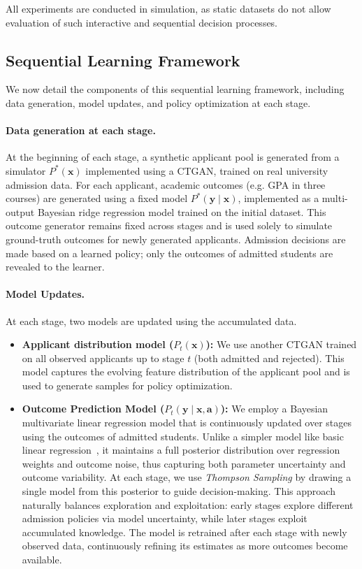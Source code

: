 \documentclass[acmlarge]{acmart-ecaf}
\newcommand {\Pfeat} {\mathbf{x}}
\newcommand {\Pact} {\mathbf{a}}
\newcommand {\Pout} {\mathbf{y}}
\begin{document}
All experiments are conducted in simulation, as static datasets do not allow evaluation of such interactive and sequential decision processes.

\subsection{Sequential Learning Framework}

We now detail the components of this sequential learning framework, including data generation, model updates, and policy optimization at each stage.


\paragraph{Data generation at each stage.} At the beginning of each stage, a synthetic applicant pool is generated from a simulator $P^*(\Pfeat)$ implemented using a CTGAN, trained on real university admission data. For each applicant, academic outcomes (e.g. GPA in three courses) are generated using a fixed model $P^*(\Pout \mid \Pfeat)$, implemented as a multi-output Bayesian ridge regression model trained on the initial dataset. This outcome generator remains fixed across stages and is used solely to simulate ground-truth outcomes for newly generated applicants. Admission decisions are made based on a learned policy; only the outcomes of admitted students are revealed to the learner.



\paragraph{Model Updates.} At each stage, two models are updated using the accumulated data.
\begin{itemize}

    \item \textbf{Applicant distribution model ($P_t(\Pfeat)$):} 
    We use another CTGAN trained on all observed applicants up to stage $t$ (both admitted and rejected). This model captures the evolving feature distribution of the applicant pool and is used to generate samples for policy optimization.


    \item \textbf{Outcome Prediction Model ($P_t(\Pout \mid \Pfeat, \Pact)$):} We employ a Bayesian multivariate linear regression model \cite{minka2000bayesian} that is continuously updated over stages using the outcomes of admitted students. Unlike a simpler model like basic linear regression~\cite{kleine2022meritocracy}, it maintains a full posterior distribution over regression weights and outcome noise, thus capturing both parameter uncertainty and outcome variability. At each stage, we use \emph{Thompson Sampling} by drawing a single model from this posterior to guide decision-making. This approach naturally balances exploration and exploitation: early stages explore different admission policies via model uncertainty, while later stages exploit accumulated knowledge. The model is retrained after each stage with newly observed data, continuously refining its estimates as more outcomes become available.
   
\end{itemize} 
\end{document}
